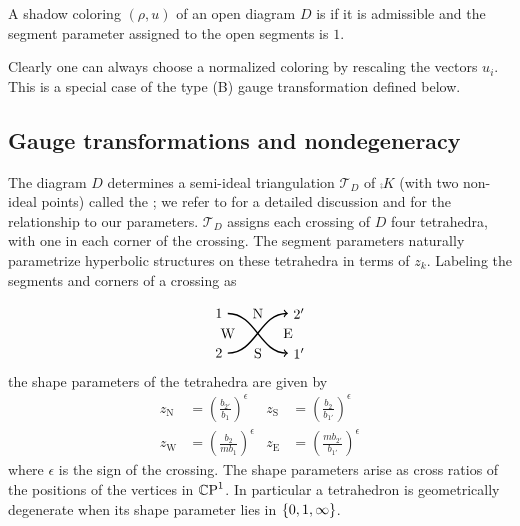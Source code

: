 \documentclass[margincite, leqno]{sl2art}
\numberwithin{equation}{section}
\begin{document}
\begin{definition}
  A shadow coloring \((\rho, u)\) of an open diagram \(D\) is
   if it is admissible and the segment parameter
  assigned to the open segments is \(1\).
\end{definition}

Clearly one can always choose a normalized coloring by rescaling the
vectors \(u_{i}\).
This is a special case of the type (B) gauge transformation defined below.

\subsection{Gauge transformations and nondegeneracy }%
\label{sec:Gauge transformations and admissibility}

The diagram \(D\) determines a semi-ideal triangulation
\(\mathcal{T}_{D}\) of \(\comp{K}\) (with two non-ideal points)
called the ;
we refer to \cite{Kim2018} for a detailed discussion and
\cite{McphailSnyder2022hyperbolicstructureslinkcomplements,
McphailSnyder2024octahedralcoordinateswirtingerpresentation} for the
relationship to our parameters.
\(\mathcal{T}_{D}\) assigns each crossing of \(D\) four tetrahedra,
with one in each corner of the crossing.
The segment parameters naturally parametrize hyperbolic structures on
these tetrahedra in terms of  \(z_{k}\).
Labeling the segments and corners of a crossing as
\begin{equation}
  \label{eq:crossing labeled}
  \begin{tikzpicture}[line width=1, baseline=30, scale=1]
    \draw[->] (0,0) node[left] {\({2}\)} \br (1.5,1) node[right] {\({2'}\)};
    \draw[->] (0,1) node[left] {\({1}\)} \br (1.5,0) node[right] {\({1'}\)};
    \draw (0.75,1) node {\(\lN\)};
    \draw (0,0.5) node {\(\lW\)};
    \draw (0.75,0) node {\(\lS\)};
    \draw (1.5,0.5) node {\(\lE\)};
  \end{tikzpicture}
\end{equation}
the shape parameters of the tetrahedra are given by
\begin{equation}
  \label{eq:shape parameters}
  \begin{aligned}
    z_{\operatorname{N}} &= \left( \frac{b_{2'}}{b_{1}} \right)^{\epsilon}
    &
    z_{\operatorname{S}} &= \left( \frac{b_{2}}{b_{1'}}\right)^{\epsilon}
    \\
    z_{\operatorname{W}} &= \left(\frac{b_{2}}{m b_{1}}\right)^{\epsilon}
    &
    z_{\operatorname{E}} &= \left(\frac{m b_{2'}}{b_{1'}}\right)^{\epsilon}
  \end{aligned}
\end{equation}
where \(\epsilon\) is the sign of the crossing.
The shape parameters arise as cross ratios of the positions of the
vertices in \(\pjsp\).
In particular a tetrahedron is geometrically degenerate when its
shape parameter lies in \(\set{0, 1, \infty}\).
\end{document}
